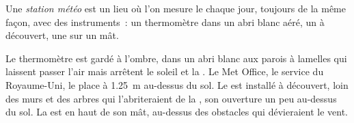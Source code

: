 \begin{definition}\label{def:g4:clouds-rain-snow:weather-station}
Une \emph{station météo} est un lieu où
l'on mesure le  chaque jour, toujours de la même façon,
avec des instruments~: un thermomètre dans un abri blanc aéré, un
 à découvert, une  sur un mât.
\end{definition}

Le thermomètre est gardé à l'ombre, dans un abri blanc aux parois à
lamelles qui laissent passer l'air mais arrêtent le soleil et la . Le
Met Office, le service  du Royaume-Uni, le place à
\SI{1.25}{\metre} au-dessus du sol. Le 
est installé à découvert, loin des murs et des arbres qui l'abriteraient de
la , son ouverture un peu au-dessus du sol. La  est en haut
de son mât, au-dessus des obstacles qui dévieraient le vent.

